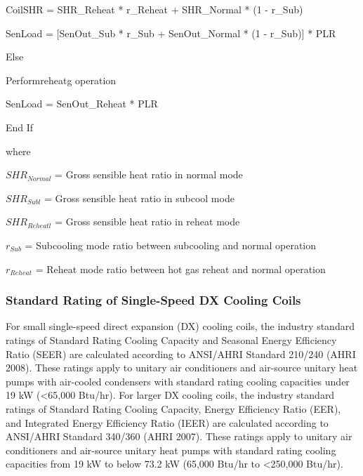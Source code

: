 	CoilSHR = SHR_{Reheat} * r_{Reheat} + SHR_{Normal} * (1 - r_{Sub})

	SenLoad = [SenOut_{Sub} * r_{Sub} + SenOut_{Normal} * (1 - r_{Sub})] * PLR


Else

    Performreheatg operation

    SenLoad = SenOut_{Reheat} * PLR

End If

where
 
\(SHR_{Normal}\) = Gross sensible heat ratio in normal mode

\(SHR_{Subl}\) = Gross sensible heat ratio in subcool mode

\(SHR_{Reheatl}\) = Gross sensible heat ratio in reheat mode

\(r_{Sub}\) = Subcooling mode ratio between subcooling and normal operation

\(r_{Reheat}\) = Reheat mode ratio between hot gas reheat and normal operation

\subsubsection{Standard Rating of Single-Speed DX Cooling Coils}\label{standard-rating-of-single-speed-dx-cooling-coils}

For small single-speed direct expansion (DX) cooling coils, the industry standard ratings of Standard Rating Cooling Capacity and Seasonal Energy Efficiency Ratio (SEER) are calculated according to ANSI/AHRI Standard 210/240 (AHRI 2008). These ratings apply to unitary air conditioners and air-source unitary heat pumps with air-cooled condensers with standard rating cooling capacities under 19 kW (\textless{}65,000 Btu/hr). For larger DX cooling coils, the industry standard ratings of Standard Rating Cooling Capacity, Energy Efficiency Ratio (EER), and Integrated Energy Efficiency Ratio (IEER) are calculated according to ANSI/AHRI Standard 340/360 (AHRI 2007). These ratings apply to unitary air conditioners and air-source unitary heat pumps with standard rating cooling capacities from 19 kW to below 73.2 kW (65,000 Btu/hr to \textless{}250,000 Btu/hr).

